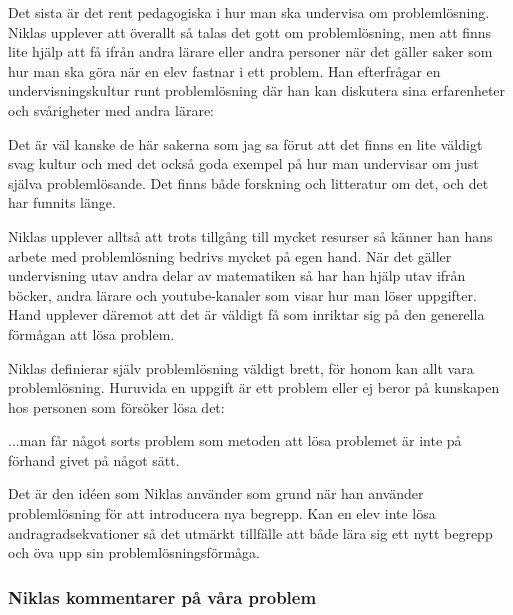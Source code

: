 \textcolor{turkos}{Det sista är det rent pedagogiska i hur man ska undervisa om problemlösning. Niklas upplever att överallt så talas det gott om problemlösning, men att finns lite hjälp att få ifrån andra lärare eller andra personer när det gäller saker som hur man ska göra när en elev fastnar i ett problem. Han efterfrågar en undervisningskultur runt problemlösning där han kan diskutera sina erfarenheter och svårigheter med andra lärare: 
}

\begin{displayquote}
\textcolor{turkos}{Det är väl kanske de här sakerna som jag sa förut att det finns en lite väldigt svag kultur och med det också goda exempel på hur man undervisar om just själva problemlösande. Det finns både forskning och litteratur om det, och det har funnits länge.}
\end{displayquote}

\textcolor{turkos}{
Niklas upplever alltså att trots tillgång till mycket resurser så känner han hans arbete med problemlösning bedrivs mycket på egen hand. När det gäller undervisning utav andra delar av matematiken så har han hjälp utav ifrån böcker, andra lärare och youtube-kanaler som visar hur man löser uppgifter. Hand upplever däremot att det är väldigt få som inriktar sig på den generella förmågan att lösa problem. 
}

\textcolor{turkos}{
Niklas definierar själv problemlösning väldigt brett, för honom kan allt vara problemlösning. Huruvida en uppgift är ett problem eller ej beror på kunskapen hos personen som försöker lösa det:
}

\begin{displayquote}
\textcolor{turkos}{
...man får något sorts problem som metoden att lösa problemet är inte på förhand givet på något sätt.
}
\end{displayquote}

\textcolor{turkos}{
Det är den idéen som Niklas använder som grund när han använder problemlösning för att introducera nya begrepp. Kan en elev inte lösa andragradsekvationer så det utmärkt tillfälle att både lära sig ett nytt begrepp och öva upp sin problemlösningsförmåga. 
}




\subsubsection{Niklas kommentarer på våra problem}

